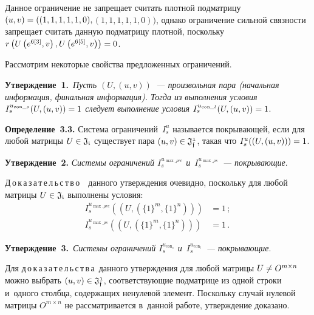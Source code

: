 \begin{multicols}{2}
\begin{description}
Данное ограничение не запрещает считать плотной подматрицу 
$(u,v)\hm= ((1,1,1,1,1,0),$\linebreak $ (1,1,1,1,1,0))$, однако ограничение сильной связности 
запрещает считать данную подматрицу плотной, поскольку  $r\left(U\left(e^{6[3]}, v\right), 
U\left(e^{6[5]}, v\right)\right) \hm= 0$.
\end{description}

Рассмотрим некоторые свойства предложенных ограничений.
    
\smallskip

\noindent
\textbf{Утверждение~1.}\ \textit{Пусть $(U,(u,v))$~--- произвольная пара 
(начальная информация, финальная информация). Тогда из выполнения условия 
$I_s^{u_{\mathrm{con}\_s}}(U,(u,v)) \hm= 1$ следует выполнение условия} 
$I_s^{u_{\mathrm{con}\_l}}(U,(u,v)) \hm= 1$.

\smallskip

\noindent
\textbf{Определение~3.3.} Система ограничений~$I_s^{u}$ называется 
покрывающей, если для любой матрицы $U \hm\in \mathfrak{J_i}$ существует пара 
$(u,v)\hm \in \mathfrak{J_{f}^1}$, такая что $I_s^{u}((U,(u,v)))\hm=1$.

\smallskip

\noindent
\textbf{Утверждение~2.} \textit{Системы ограничений $I_s^{u_{\max\_\rho rc}}$ 
и~$I_s^{u_{\max\_\rho s}}$~--- покрывающие}.

\smallskip

\noindent
Д\,о\,к\,а\,з\,а\,т\,е\,л\,ь\,с\,т\,в\,о\ \ данного утверждения очевидно, поскольку для любой матрицы $ U \hm\in 
\mathfrak{J_i}$ выполнены условия: 
\begin{align*}
I_s^{u_{\max\_\rho rc}}\left(\left(U, \left(\{1\}^m, 
\{1\}^n\right)\right)\right)&=1\,;\\
I_s^{u_{\max\_\rho s}}\left(\left(U, \left(\{1\}^m, \{1\}^n\right)\right)\right)&=1\,.
\end{align*}


\noindent
\textbf{Утверждение~3.}\ \textit{Системы ограничений $I_s^{u_{\mathrm{con}_s}}$
и~$I_s^{u_{\mathrm{con}_l}}$~--- покрывающие}.

\smallskip

\noindent
Для д\,о\,к\,а\,з\,а\,т\,е\,л\,ь\,с\,т\,в\,а\ данного утверждения для любой матрицы $U\hm\ne O^{m\times n}$ 
можно выбрать $(u,v) \hm\in \mathfrak{J_{f}^1}$, соответствующие подматрице из 
одной строки и~одного столбца, содержащих ненулевой элемент. Поскольку случай 
нулевой матрицы $O^{m\times n}$ не рассматривается в~данной работе, утверждение 
доказано.



\end{multicols}

